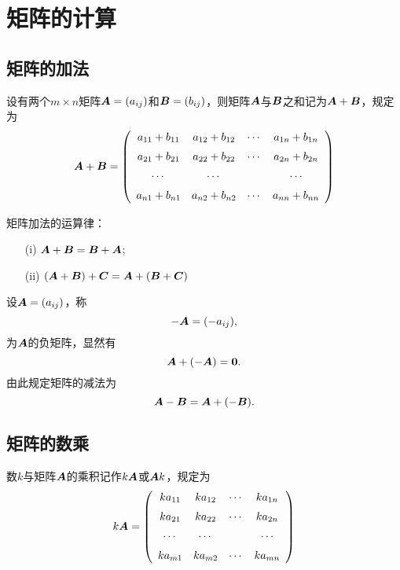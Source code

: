 \section{矩阵的计算}
\subsection{矩阵的加法}
\begin{frame}
\begin{dingyi}[矩阵的加法]
  设有两个$m\times n$矩阵$\boldsymbol{A}=(a_{ij})$和$\boldsymbol{B}=(b_{ij})$，则矩阵$\boldsymbol{A}$与$\boldsymbol{B}$之和记为$\boldsymbol{A}+\boldsymbol{B}$，规定为
  $$
  \boldsymbol{A} + \boldsymbol{B} = 
  \left(
    \begin{array}{cccc}
      a_{11} + b_{11}  & a_{12} + b_{12}  & \cdots & a_{1n} + b_{1n}  \\[0.2cm]
      a_{21} + b_{21}  & a_{22} + b_{22}  & \cdots & a_{2n} + b_{2n}  \\[0.2cm]
      \cdots            & \cdots            &     & \cdots            \\[0.2cm]
      a_{n1} + b_{n1}  & a_{n2} + b_{n2}  & \cdots & a_{nn} + b_{nn}  
    \end{array}
  \right)
  $$
\end{dingyi} \pause 

\begin{zhu}
\end{zhu}
\end{frame}

\begin{frame}
矩阵加法的运算律：
\begin{itemize}
\item[(i)] $\boldsymbol{A} + \boldsymbol{B} = \boldsymbol{B} + \boldsymbol{A}$;
\item[(ii)] $(\boldsymbol{A} + \boldsymbol{B}) + \boldsymbol{C} = \boldsymbol{A} + (\boldsymbol{B} + \boldsymbol{C})$ 
\end{itemize}

设$\boldsymbol{A} = (a_{ij})$，称
$$
-\boldsymbol{A} = (-a_{ij}),
$$
为$\boldsymbol{A}$的负矩阵，显然有
$$
\boldsymbol{A} + (-\boldsymbol{A}) = \mathbf{0}.
$$
由此规定矩阵的减法为
$$
\boldsymbol{A} - \boldsymbol{B} = \boldsymbol{A} + (-\boldsymbol{B}).
$$
\end{frame}
\subsection{矩阵的数乘}

\begin{frame} 
\begin{dingyi}[矩阵的数乘]
  数$k$与矩阵$\boldsymbol{A}$的乘积记作$k \boldsymbol{A}$或$\boldsymbol{A} k$，规定为
  $$
  k \boldsymbol{A} = 
  \left(
    \begin{array}{cccc}
      k a_{11}   & k a_{12}   & \cdots & k a_{1n}  \\[0.2cm]
      k a_{21}   & k a_{22}   & \cdots & k a_{2n}  \\[0.2cm]
      \cdots     & \cdots     &     & \cdots    \\[0.2cm]
      k a_{m1}   & k a_{m2}   & \cdots & k a_{mn}  
    \end{array}
  \right)
  $$
\end{dingyi}\pause 

\begin{zhu}
\end{zhu}
\end{frame}


